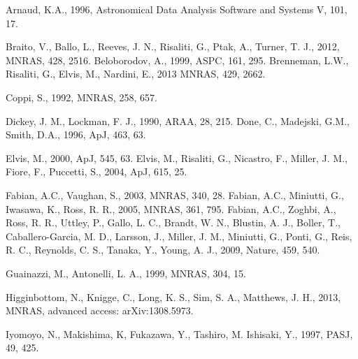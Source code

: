 \documentclass[useAMS,usenatbib]{sam}
\begin{document}
\begin{thebibliography}{99}

      Arnaud, K.A., 1996, Astronomical Data Analysis Software and Systems V, 101, 17.

     Braito, V., Ballo, L., Reeves, J. N., Risaliti, G., Ptak, A., Turner, T. J., 2012, MNRAS, 428, 2516.
     Beloborodov, A., 1999, ASPC, 161, 295.
     Brenneman, L.W., Risaliti, G., Elvis, M., Nardini, E., 2013 MNRAS, 429, 2662.

     Coppi, S., 1992, MNRAS, 258, 657.
    
     Dickey, J. M., Lockman, F. J., 1990, ARAA, 28, 215.
     Done, C., Madejski, G.M., Smith, D.A., 1996, ApJ, 463, 63.
    
     Elvis, M., 2000, ApJ, 545, 63.
     Elvis, M., Risaliti, G., Nicastro, F., Miller, J. M., Fiore, F., Puccetti, S., 2004, ApJ, 615, 25.
    
     Fabian, A.C., Vaughan, S., 2003, MNRAS, 340, 28.
     Fabian, A.C., Miniutti, G., Iwasawa, K., Ross, R. R., 2005, MNRAS, 361, 795.
     Fabian, A.C., Zoghbi, A., Ross, R. R., Uttley, P., Gallo, L. C., Brandt, W. N., Blustin, A. J.,
Boller, T., Caballero-Garcia, M. D., Larsson, J., Miller, J. M., Miniutti, G., Ponti, G., Reis, R. C., Reynolds, C. S., Tanaka, Y., Young, A. J., 2009, Nature, 459,
540.
    
     Guainazzi, M., Antonelli, L. A., 1999, MNRAS, 304, 15.

     Higginbottom, N., Knigge, C., Long, K. S., Sim, S. A., Matthews, J. H., 2013, MNRAS,
advanced  access: arXiv:1308.5973.
    
     Iyomoyo, N., Makishima, K, Fukazawa, Y., Tashiro, M. Ishisaki, Y., 1997, PASJ, 49, 425.
    

\end{thebibliography}
\end{document}
